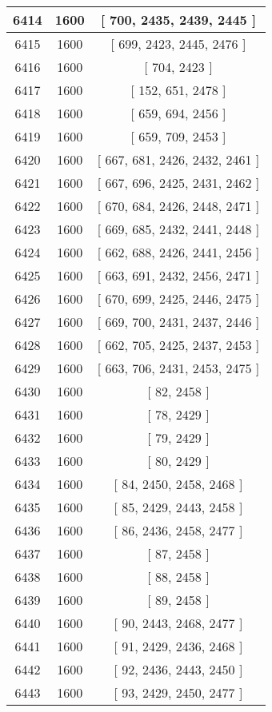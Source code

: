 \begin{center}
\begin{longtable}[H]{|| c c c ||}
\hline
6414 & 1600 & [ 700, 2435, 2439, 2445 ] \\ 
\hline
6415 & 1600 & [ 699, 2423, 2445, 2476 ] \\ 
\hline
6416 & 1600 & [ 704, 2423 ] \\ 
\hline
6417 & 1600 & [ 152, 651, 2478 ] \\ 
\hline
6418 & 1600 & [ 659, 694, 2456 ] \\ 
\hline
6419 & 1600 & [ 659, 709, 2453 ] \\ 
\hline
6420 & 1600 & [ 667, 681, 2426, 2432, 2461 ] \\ 
\hline
6421 & 1600 & [ 667, 696, 2425, 2431, 2462 ] \\ 
\hline
6422 & 1600 & [ 670, 684, 2426, 2448, 2471 ] \\ 
\hline
6423 & 1600 & [ 669, 685, 2432, 2441, 2448 ] \\ 
\hline
6424 & 1600 & [ 662, 688, 2426, 2441, 2456 ] \\ 
\hline
6425 & 1600 & [ 663, 691, 2432, 2456, 2471 ] \\ 
\hline
6426 & 1600 & [ 670, 699, 2425, 2446, 2475 ] \\ 
\hline
6427 & 1600 & [ 669, 700, 2431, 2437, 2446 ] \\ 
\hline
6428 & 1600 & [ 662, 705, 2425, 2437, 2453 ] \\ 
\hline
6429 & 1600 & [ 663, 706, 2431, 2453, 2475 ] \\ 
\hline
6430 & 1600 & [ 82, 2458 ] \\ 
\hline
6431 & 1600 & [ 78, 2429 ] \\ 
\hline
6432 & 1600 & [ 79, 2429 ] \\ 
\hline
6433 & 1600 & [ 80, 2429 ] \\ 
\hline
6434 & 1600 & [ 84, 2450, 2458, 2468 ] \\ 
\hline
6435 & 1600 & [ 85, 2429, 2443, 2458 ] \\ 
\hline
6436 & 1600 & [ 86, 2436, 2458, 2477 ] \\ 
\hline
6437 & 1600 & [ 87, 2458 ] \\ 
\hline
6438 & 1600 & [ 88, 2458 ] \\ 
\hline
6439 & 1600 & [ 89, 2458 ] \\ 
\hline
6440 & 1600 & [ 90, 2443, 2468, 2477 ] \\ 
\hline
6441 & 1600 & [ 91, 2429, 2436, 2468 ] \\ 
\hline
6442 & 1600 & [ 92, 2436, 2443, 2450 ] \\ 
\hline
6443 & 1600 & [ 93, 2429, 2450, 2477 ] \\ 

\end{longtable}
\end{center}
